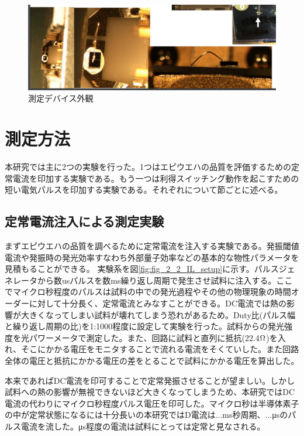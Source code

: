 \begin{figure}[t]
	\centering
	\includegraphics[width=15cm]{figure/fig_2_1_mount.png}
	\caption{測定デバイス外観}
	\label{fig_2_1_mount}
\end{figure}
\clearpage
\section{測定方法}%
本研究では主に2つの実験を行った。1つはエピウエハの品質を評価するための定常電流を印加する実験である。もう一つは利得スイッチング動作を起こすための短い電気パルスを印加する実験である。それぞれについて節ごとに述べる。
\subsection{定常電流注入による測定実験}%
まずエピウエハの品質を調べるために定常電流を注入する実験である。発振閾値電流や発振時の発光効率すなわち外部量子効率などの基本的な物性パラメータを見積もることができる。
実験系を図\ref{fig:fig_2_2_IL_setup}に示す。パルスジェネレータから数usパルスを数ms繰り返し周期で発生させ試料に注入する。ここでマイクロ秒程度のパルスは試料の中での発光過程やその他の物理現象の時間オーダーに対して十分長く、定常電流とみなすことができる。DC電流では熱の影響が大きくなってしまい試料が壊れてしまう恐れがあるため。Duty比(パルス幅と繰り返し周期の比)を1:1000程度に設定して実験を行った。試料からの発光強度を光パワーメータで測定した。また、回路に試料と直列に抵抗(22.4$\rm{\Omega}$)を入れ、そこにかかる電圧をモニタすることで流れる電流をそくていした。また回路全体の電圧と抵抗にかかる電圧の差をとることで試料にかかる電圧を算出した。

本来であればDC電流を印可することで定常発振させることが望ましい。しかし試料への熱の影響が無視できないほど大きくなってしまうため、本研究ではDC電流の代わりにマイクロ秒程度パルス電圧を印可した。マイクロ秒は半導体素子の中が定常状態になるには十分長いの本研究ではD電流は...ms秒周期、...μsのパルス電流を流した。μs程度の電流は試料にとっては定常と見なされる。

